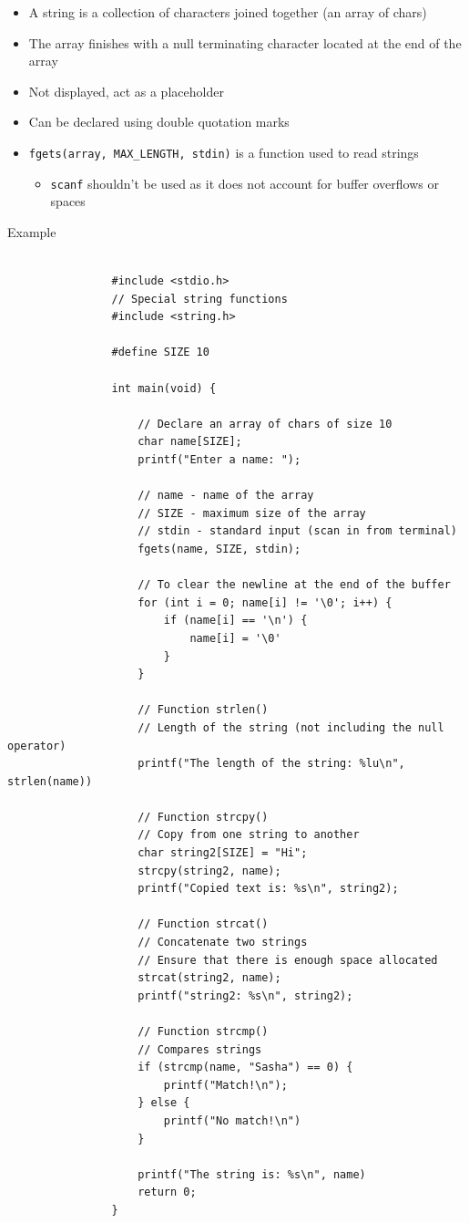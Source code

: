 \documentclass{article}
\begin{document}
		\begin{itemize}
			\item A string is a collection of characters joined together (an array of chars)
			\item The array finishes with a null terminating character located at the end of the array
			\item Not displayed, act as a placeholder
			\item Can be declared using double quotation marks
			\item \texttt{fgets(array, MAX_LENGTH, stdin)} is a function used to read strings
				\begin{itemize}
					\item \texttt{scanf} shouldn't be used as it does not account for buffer overflows or spaces
				\end{itemize}
		\end{itemize}

		\begin{question}{Example}
			\begin{verbatim}
				
				#include <stdio.h>
				// Special string functions
				#include <string.h>

				#define SIZE 10

				int main(void) {

					// Declare an array of chars of size 10
					char name[SIZE];
					printf("Enter a name: ");

					// name - name of the array
					// SIZE - maximum size of the array
					// stdin - standard input (scan in from terminal)
					fgets(name, SIZE, stdin);

					// To clear the newline at the end of the buffer
					for (int i = 0; name[i] != '\0'; i++) {
						if (name[i] == '\n') {
							name[i] = '\0'
						}
					}

					// Function strlen()
					// Length of the string (not including the null operator)
					printf("The length of the string: %lu\n", strlen(name))

					// Function strcpy()
					// Copy from one string to another
					char string2[SIZE] = "Hi";
					strcpy(string2, name);
					printf("Copied text is: %s\n", string2);

					// Function strcat()
					// Concatenate two strings
					// Ensure that there is enough space allocated
					strcat(string2, name);
					printf("string2: %s\n", string2);

					// Function strcmp()
					// Compares strings
					if (strcmp(name, "Sasha") == 0) {
						printf("Match!\n");
					} else {
						printf("No match!\n")
					}

					printf("The string is: %s\n", name)
					return 0;
				}

			\end{verbatim}
		\end{question}
\end{document}

